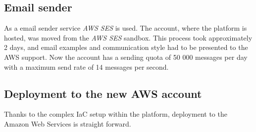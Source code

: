 \subsection{Email sender}
\label{attachment:ses}
As a email sender service \textit{AWS \ac{SES}} is used.
The account, where the platform is hosted, was moved from the \textit{AWS \ac{SES}} sandbox.
This process took approximately 2 days, and email examples and communication style had to be presented to the AWS support. 
Now the account has a sending quota of 50 000 messages per day with a maximum send rate of 14 messages per second.


\subsection{Deployment to the new AWS account}
Thanks to the complex \ac{IaC} setup within the platform, deployment to the Amazon Web Services is straight forward.

